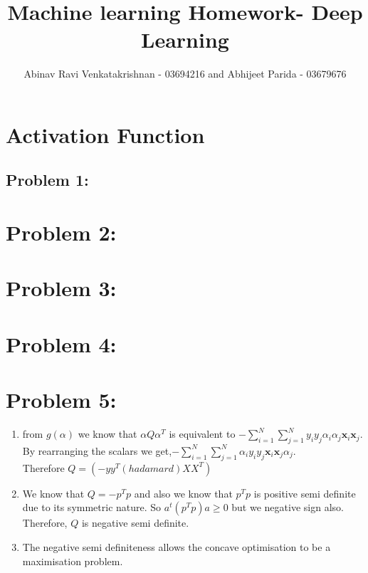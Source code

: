 \documentclass[5pt,a4paper]{article}
\begin{document}
	\title{Machine learning Homework- Deep Learning }
	\author{Abinav Ravi Venkatakrishnan - 03694216 and Abhijeet Parida - 03679676}
	\maketitle
	\section{Activation Function}
	\subsection*{Problem 1:}
	
	
	\section*{Problem 2:}
	
	
	\section*{Problem 3:}
	
	
	\section*{Problem 4:}
	
	\section*{Problem 5:}
	\begin{enumerate}
		\item from $g(\alpha)$ we know that $\alpha Q\alpha^T$ is equivalent to $-\sum_{i=1}^{N}\sum_{j=1}^{N} y_i y_j \alpha_i \alpha_j \textbf{x}_i \textbf{x}_j$. By rearranging the scalars we get,$-\sum_{i=1}^{N}\sum_{j=1}^{N}\alpha_i  y_i y_j  \textbf{x}_i \textbf{x}_j \alpha_j$. \\Therefore $Q= (-yy^T(hadamard)XX^T)$		\item We know that $Q=-p^Tp$ and also we know that $p^Tp$ is positive semi definite due to its symmetric nature. So $a^t (p^Tp)a \geq 0$ but we negative sign also. Therefore, $Q$ is negative semi definite.
		\item The negative semi definiteness allows the concave optimisation to be a maximisation problem. 
	\end{enumerate}
	
\end{document}
